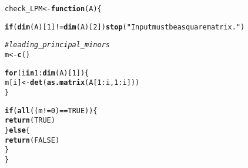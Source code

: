\documentclass[11pt, a4paper]{article}\usepackage[]{graphicx}\usepackage[]{xcolor}
\makeatletter
\newcommand{\hlnum}[1]{\textcolor[rgb]{0.686,0.059,0.569}{#1}}%
\newcommand{\hlsng}[1]{\textcolor[rgb]{0.192,0.494,0.8}{#1}}%
\newcommand{\hlcom}[1]{\textcolor[rgb]{0.678,0.584,0.686}{\textit{#1}}}%
\newcommand{\hlopt}[1]{\textcolor[rgb]{0,0,0}{#1}}%
\newcommand{\hldef}[1]{\textcolor[rgb]{0.345,0.345,0.345}{#1}}%
\newcommand{\hlkwa}[1]{\textcolor[rgb]{0.161,0.373,0.58}{\textbf{#1}}}%
\newcommand{\hlkwb}[1]{\textcolor[rgb]{0.69,0.353,0.396}{#1}}%
\newcommand{\hlkwc}[1]{\textcolor[rgb]{0.333,0.667,0.333}{#1}}%
\newcommand{\hlkwd}[1]{\textcolor[rgb]{0.737,0.353,0.396}{\textbf{#1}}}%
\newenvironment{kframe}{%
 \def\at@end@of@kframe{}%
 \ifinner\ifhmode%
  \def\at@end@of@kframe{\end{minipage}}%
  \begin{minipage}{\columnwidth}%
 \fi\fi%
 \def\FrameCommand##1{\hskip\@totalleftmargin \hskip-\fboxsep
 \colorbox{shadecolor}{##1}\hskip-\fboxsep
     \hskip-\linewidth \hskip-\@totalleftmargin \hskip\columnwidth}%
 \MakeFramed {\advance\hsize-\width
   \@totalleftmargin\z@ \linewidth\hsize
   \@setminipage}}%
 {\par\unskip\endMakeFramed%
 \at@end@of@kframe}
\newenvironment{knitrout}{}{} %
\makeatother
\begin{document}
\begin{knitrout}
\color{fgcolor}\begin{kframe}
\begin{alltt}
\hldef{check_LPM} \hlkwb{<-} \hlkwa{function}\hldef{(}\hlkwc{A}\hldef{)\{}

  \hlkwa{if}\hldef{(}\hlkwd{dim}\hldef{(A)[}\hlnum{1}\hldef{]} \hlopt{!=} \hlkwd{dim}\hldef{(A)[}\hlnum{2}\hldef{])} \hlkwd{stop}\hldef{(}\hlsng{"Input must be a square matrix."}\hldef{)}

  \hlcom{# leading_principal_minors }
  \hldef{m} \hlkwb{<-} \hlkwd{c}\hldef{()}

  \hlkwa{for} \hldef{(i} \hlkwa{in} \hlnum{1}\hlopt{:}\hlkwd{dim}\hldef{(A)[}\hlnum{1}\hldef{]) \{}
    \hldef{m[i]} \hlkwb{<-} \hlkwd{det}\hldef{(}\hlkwd{as.matrix}\hldef{(A[}\hlnum{1}\hlopt{:}\hldef{i,} \hlnum{1}\hlopt{:}\hldef{i]))}
  \hldef{\}}

  \hlkwa{if}\hldef{(}\hlkwd{all}\hldef{((m} \hlopt{!=} \hlnum{0}\hldef{)} \hlopt{==} \hlnum{TRUE}\hldef{))\{}
    \hlkwd{return}\hldef{(}\hlnum{TRUE}\hldef{)}
  \hldef{\}}\hlkwa{else}\hldef{\{}
    \hlkwd{return}\hldef{(}\hlnum{FALSE}\hldef{)}
  \hldef{\}}
\hldef{\}}
\end{alltt}
\end{kframe}
\end{knitrout}
\end{document}
